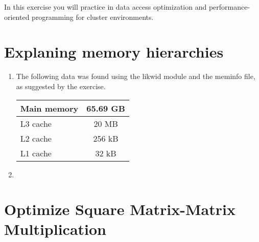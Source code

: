 \documentclass[unicode,11pt,a4paper,oneside,numbers=endperiod,openany]{scrartcl}
\begin{document}
\setassignment
{}

\newline

In this exercise you will practice in data access optimization and performance-oriented programming for cluster environments.


\section{Explaning memory hierarchies }

\begin{enumerate}
    \item  The following data was found using the likwid module and the meminfo file, as suggested by the exercise.\\
        \begin{tabular}{| l || c |}
            \hline
            Main memory & 65.69 GB \\ 
            \hline
            L3 cache & 20 MB \\
            \hline
            L2 cache & 256 kB \\
            \hline 
            L1 cache & 32 kB \\
            \hline
        \end{tabular}
    \item 
\end{enumerate}

\section{Optimize Square Matrix-Matrix Multiplication  }
\end{document}
